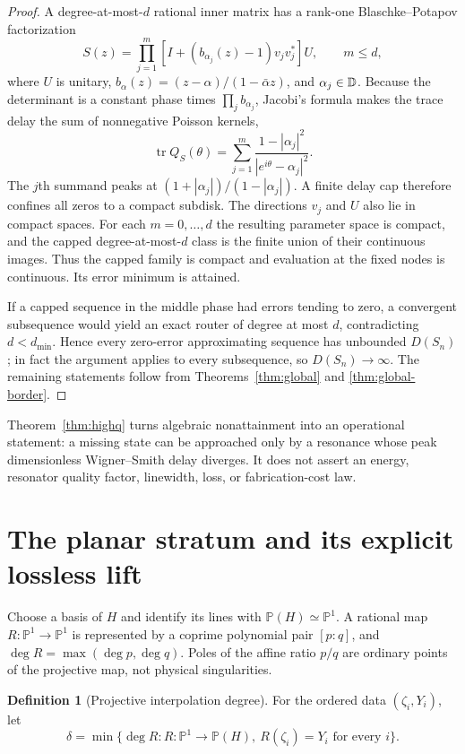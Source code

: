 \documentclass[11pt]{article}
\theoremstyle{definition}\newtheorem{definition}[theorem]{Definition}\newtheorem{example}[theorem]{Example}
\theoremstyle{remark}\newtheorem{remark}[theorem]{Remark}\newtheorem{limitation}[theorem]{Limitation}
\newcommand{\PP}{\mathbb P}\newcommand{\rank}{\operatorname{rank}}
\begin{document}
\begin{proof}
A degree-at-most-$d$ rational inner matrix has a rank-one
Blaschke--Potapov factorization \cite{Potapov1955,AlpayJorgensenLewkowicz2016}
\[
 S(z)=\prod_{j=1}^m\left[I+(b_{\alpha_j}(z)-1)v_jv_j^*\right]U,
 \qquad m\le d,
\]
where $U$ is unitary,
$b_\alpha(z)=(z-\alpha)/(1-\bar\alpha z)$, and $\alpha_j\in\mathbb D$.
Because the determinant is a constant phase times $\prod_jb_{\alpha_j}$,
Jacobi's formula makes the trace delay the sum of nonnegative Poisson kernels,
\[
 \operatorname{tr}Q_S(\theta)=\sum_{j=1}^m
 \frac{1-|\alpha_j|^2}{|e^{i\theta}-\alpha_j|^2}.
\]
The $j$th summand peaks at $(1+|\alpha_j|)/(1-|\alpha_j|)$.  A finite delay cap
therefore confines all zeros to a compact subdisk.  The directions $v_j$ and
$U$ also lie in compact spaces.  For each $m=0,\ldots,d$ the resulting
parameter space is compact, and the capped degree-at-most-$d$ class is the
finite union of their continuous images.
Thus the capped family is compact and evaluation at the fixed nodes is
continuous.  Its error minimum is attained.

If a capped sequence in the middle phase had errors tending to zero, a
convergent subsequence would yield an exact router of degree at most $d$,
contradicting $d<d_{\min}$.  Hence every zero-error approximating sequence has
unbounded $D(S_n)$; in fact the argument applies to every subsequence, so
$D(S_n)\to\infty$.  The remaining statements follow from
Theorems~\ref{thm:global} and \ref{thm:global-border}.
\end{proof}

Theorem~\ref{thm:highq} turns algebraic nonattainment into an operational
statement: a missing state can be approached only by a resonance whose peak
dimensionless Wigner--Smith delay diverges.  It does not assert an energy,
resonator quality factor, linewidth, loss, or fabrication-cost law.

\section{The planar stratum and its explicit lossless lift}

Choose a basis of $H$ and identify its lines with $\PP(H)\simeq\PP^1$.  A
rational map $R:\PP^1\to\PP^1$ is represented by a coprime polynomial pair
$[p:q]$, and $\deg R=\max(\deg p,\deg q)$.  Poles of the affine ratio $p/q$ are
ordinary points of the projective map, not physical singularities.

\begin{definition}[Projective interpolation degree]\label{def:delta}
For the ordered data $(\zeta_i,Y_i)$, let
\[
 \delta=\min\{\deg R:R:\PP^1\to\PP(H),\ R(\zeta_i)=Y_i\text{ for every }i\}.
\]
\end{definition}
\end{document}
